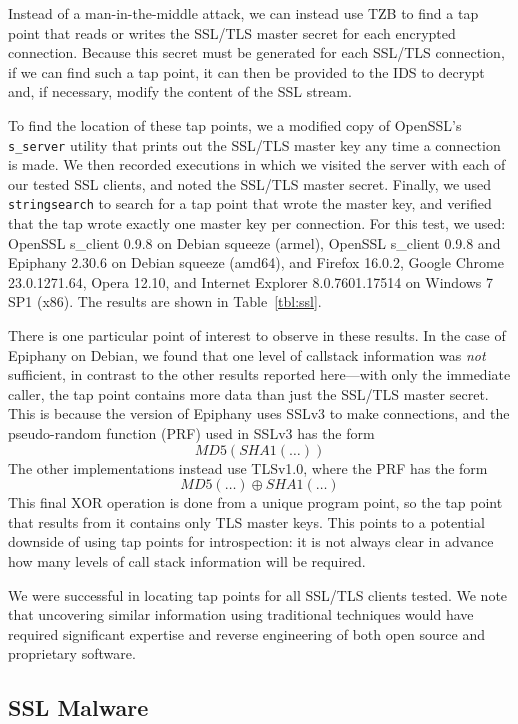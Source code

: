 Instead of a man-in-the-middle attack, we can instead use TZB to find a
tap point that reads or writes the SSL/TLS master secret for each
encrypted connection. Because this secret must be generated for each
SSL/TLS connection, if we can find such a tap point, it can then be
provided to the IDS to decrypt and, if necessary, modify the content of
the SSL stream.

To find the location of these tap points, we a modified copy of
OpenSSL's \texttt{s\_server} utility that prints out the SSL/TLS master
key any time a connection is made. We then recorded executions in which
we visited the server with each of our tested SSL clients, and noted the
SSL/TLS master secret. Finally, we used \texttt{stringsearch} to search
for a tap point that wrote the master key, and verified that the tap
wrote exactly one master key per connection. For this test, we used:
OpenSSL s\_client 0.9.8 on Debian squeeze (armel), OpenSSL s\_client
0.9.8 and Epiphany 2.30.6 on Debian squeeze (amd64), and Firefox
16.0.2, Google Chrome 23.0.1271.64, Opera 12.10, and Internet Explorer
8.0.7601.17514 on Windows 7 SP1 (x86). The results are shown in
Table~\ref{tbl:ssl}.

There is one particular point of interest to observe in these results.
In the case of Epiphany on Debian, we found that one level of callstack
information was \emph{not} sufficient, in contrast to the other results
reported here---with only the immediate caller, the tap point contains
more data than just the SSL/TLS master secret. This is because the
version of Epiphany uses SSLv3 to make connections, and the
pseudo-random function (PRF) used in SSLv3 has the form
\[ MD5(SHA1(\ldots))\] The other implementations instead use TLSv1.0,
where the PRF has the form \[ MD5(\ldots) \oplus SHA1(\ldots) \] This final
XOR operation is done from a unique program point, so the tap point that
results from it contains only TLS master keys. This points to a
potential downside of using tap points for introspection: it is not
always clear in advance how many levels of call stack information will
be required.

We were successful in locating tap points for all SSL/TLS clients tested.
We note that uncovering similar information using traditional techniques
would have required significant expertise and reverse engineering of
both open source and proprietary software.

\subsection{SSL Malware}
\label{sec:eval:subsec:sslmal}

